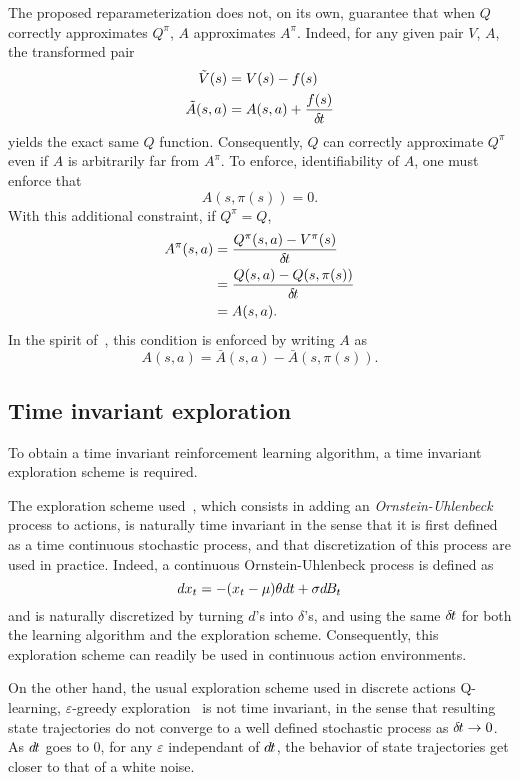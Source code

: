 \documentclass{article}
\begin{document}
The proposed reparameterization does not, on its own, guarantee that
when $Q$ correctly approximates $Q^\pi$, $A$ approximates $A^\pi$.  Indeed, for
any given pair $V$, $A$, the transformed pair
\begin{align}
	\tilde{V}(s) &= V(s) - f(s)\\
	\tilde{A}(s, a) &= A(s, a) + \frac{f(s)}{\delta\hspace{-.1em}t}
\end{align}
yields the exact same $Q$ function. Consequently, $Q$ can correctly approximate
$Q^\pi$ even if $A$ is arbitrarily far from $A^\pi$.
To enforce, identifiability of $A$, one must enforce that 
\begin{equation}
	A(s, \pi(s)) = 0.
\end{equation}
With this additional constraint, if $Q^\pi = Q$,
\begin{align}
	A^\pi(s, a) &= \frac{Q^\pi(s,a) - V^\pi(s)}{\delta\hspace{-.1em}t}\\
		    &= \frac{Q(s,a) - Q(s, \pi(s))}{\delta\hspace{-.1em}t}\\
		    &= A(s, a).
\end{align}
In the spirit of~\cite{dueling_nets}, this condition is enforced by writing $A$ as
\begin{equation}
	A(s, a) = \bar{A}(s, a) - \bar{A}(s, \pi(s)).
\end{equation}

\subsection{Time invariant exploration}
\label{subsec:explo}
To obtain a time invariant reinforcement learning algorithm, a time invariant
exploration scheme is required. 

The exploration scheme used~\cite{ddpg}, which consists in adding an
\emph{Ornstein-Uhlenbeck}~\cite{orn-uhl} process to actions, is naturally time
invariant in the sense that it is first defined as a time continuous stochastic
process, and that discretization of this process are used in practice. Indeed,
a continuous Ornstein-Uhlenbeck process is defined as
\begin{equation}
	dx_t = - (x_t - \mu) \theta dt + \sigma d\hspace{-.1em}B_t
	\label{eq:orn_uhl}
\end{equation}
and is naturally discretized by turning $d$'s into $\delta$'s, and using
the same $\delta\hspace{-.1em}t$ for both the learning algorithm and the exploration scheme.
Consequently, this exploration scheme can readily be used in continuous action
environments.

On the other hand, the usual exploration scheme used in discrete actions
Q-learning, $\varepsilon$-greedy exploration~\cite{sutton} is not time
invariant, in the sense that resulting state trajectories do not converge to a
well defined stochastic process as $\delta\hspace{-.1em}t \rightarrow 0$. As $d\hspace{-.1em}t$ goes to $0$,
for any $\varepsilon$ independant of $d\hspace{-.1em}t$, the behavior of state trajectories get
closer to that of a white noise.
\end{document}
